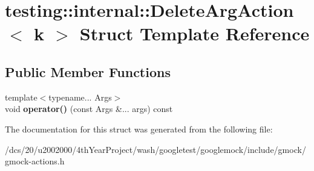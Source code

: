 \hypertarget{structtesting_1_1internal_1_1DeleteArgAction}{}\section{testing\+:\+:internal\+:\+:Delete\+Arg\+Action$<$ k $>$ Struct Template Reference}
\label{structtesting_1_1internal_1_1DeleteArgAction}
\subsection*{Public Member Functions}
\begin{DoxyCompactItemize}
\item 
\mbox{\label{structtesting_1_1internal_1_1DeleteArgAction_abb545f85ccbe49eaabb71471517dc887}} 
{\footnotesize template$<$typename... Args$>$ }\\void {\bfseries operator()} (const Args \&... args) const
\end{DoxyCompactItemize}


The documentation for this struct was generated from the following file\+:\begin{DoxyCompactItemize}
\item 
/dcs/20/u2002000/4th\+Year\+Project/wash/googletest/googlemock/include/gmock/gmock-\/actions.\+h\end{DoxyCompactItemize}
